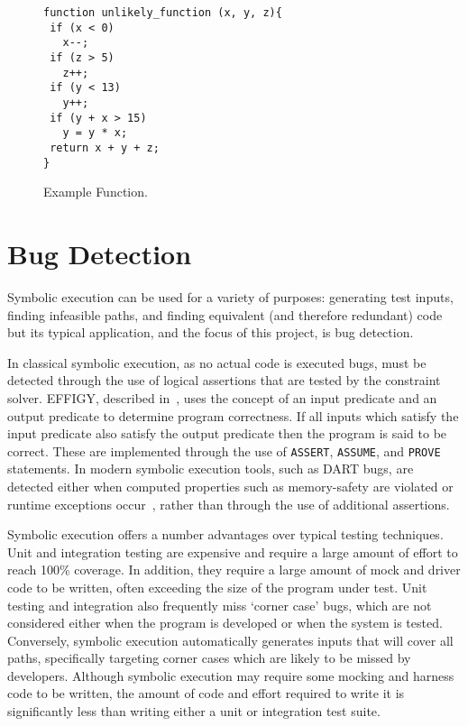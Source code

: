\documentclass[]{final_report}
\begin{document}
\begin{figure}[t]
\begin{lstlisting}
function unlikely_function (x, y, z){
 if (x < 0)
   x--;
 if (z > 5)
   z++;
 if (y < 13)
   y++;
 if (y + x > 15)
   y = y * x;
 return x + y + z;
}
\end{lstlisting}
\caption{\label{fig:example-function} Example Function.}
\end{figure} 

\section{Bug Detection}

Symbolic execution can be used for a variety of purposes: generating test inputs, finding infeasible paths, and finding equivalent (and therefore redundant) code but its typical application, and the focus of this project, is bug detection.

In classical symbolic execution, as no actual code is executed bugs, must be detected through the use of logical assertions that are tested by the constraint solver. EFFIGY, described in~\cite{king1976symbolic}, uses the concept of an input predicate and an output predicate to determine program correctness. If all inputs which satisfy the input predicate also satisfy the output predicate then the program is said to be correct. These are implemented through the use of \lstinline|ASSERT|, \lstinline|ASSUME|, and \lstinline|PROVE| statements. In modern symbolic execution tools, such as DART bugs, are detected either when computed properties such as memory-safety are violated or runtime exceptions occur~\cite{godefroid2005dart}, rather than through the use of additional assertions.

Symbolic execution offers a number advantages over typical testing techniques. Unit and integration testing are expensive and require a large amount of effort to reach 100\% coverage. In addition, they require a large amount of mock and driver code to be written, often exceeding the size of the program under test. Unit testing and integration also frequently miss `corner case' bugs, which are not considered either when the program is developed or when the system is tested. Conversely, symbolic execution automatically generates inputs that will cover all paths, specifically targeting corner cases which are likely to be missed by developers. Although symbolic execution may require some mocking and harness code to be written, the amount of code and effort required to write it is significantly less than writing either a unit or integration test suite.
\end{document}
